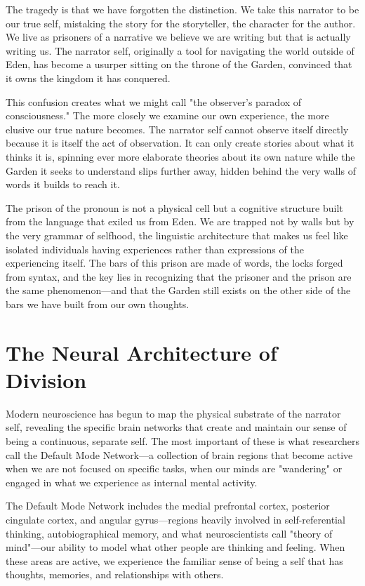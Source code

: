 The tragedy is that we have forgotten the distinction. We take this narrator to be our true self, mistaking the story for the storyteller, the character for the author. We live as prisoners of a narrative we believe we are writing but that is actually writing us. The narrator self, originally a tool for navigating the world outside of Eden, has become a usurper sitting on the throne of the Garden, convinced that it owns the kingdom it has conquered.

This confusion creates what we might call "the observer's paradox of consciousness." The more closely we examine our own experience, the more elusive our true nature becomes. The narrator self cannot observe itself directly because it is itself the act of observation. It can only create stories about what it thinks it is, spinning ever more elaborate theories about its own nature while the Garden it seeks to understand slips further away, hidden behind the very walls of words it builds to reach it.

The prison of the pronoun is not a physical cell but a cognitive structure built from the language that exiled us from Eden. We are trapped not by walls but by the very grammar of selfhood, the linguistic architecture that makes us feel like isolated individuals having experiences rather than expressions of the experiencing itself. The bars of this prison are made of words, the locks forged from syntax, and the key lies in recognizing that the prisoner and the prison are the same phenomenon—and that the Garden still exists on the other side of the bars we have built from our own thoughts.

\section{The Neural Architecture of Division}

Modern neuroscience has begun to map the physical substrate of the narrator self, revealing the specific brain networks that create and maintain our sense of being a continuous, separate self. The most important of these is what researchers call the Default Mode Network—a collection of brain regions that become active when we are not focused on specific tasks, when our minds are "wandering" or engaged in what we experience as internal mental activity.

The Default Mode Network includes the medial prefrontal cortex, posterior cingulate cortex, and angular gyrus—regions heavily involved in self-referential thinking, autobiographical memory, and what neuroscientists call "theory of mind"—our ability to model what other people are thinking and feeling. When these areas are active, we experience the familiar sense of being a self that has thoughts, memories, and relationships with others.

